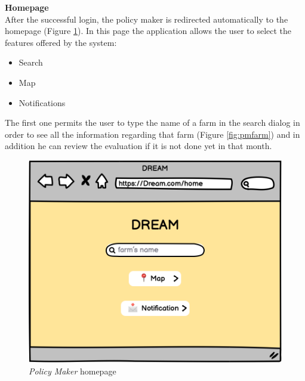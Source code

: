 \textbf{Homepage} \\
After the successful login, the policy maker is redirected automatically to the homepage (Figure \ref{fig:pmhome}). 
In this page the application allows the user to select the features offered by the system:
\begin{itemize}
    \item Search
    \item Map
    \item Notifications
\end{itemize}
The first one permits the user to type the name of a farm in the search dialog in order to see all the information regarding that farm (Figure \ref{fig:pmfarm}) and in addition he can review the evaluation if it is not done yet in that month.

\begin{figure}[H]
    \begin{minipage}{0.4\textwidth}
        \centering
        \includegraphics[width=1\textwidth]{images/mockups/PMHome.png}
        \caption{\emph{Policy Maker} homepage}
        \label{fig:pmhome}
    \end{minipage}\hfill
    \begin{minipage}{0.39\textwidth}
        \centering

\end{minipage}
\end{figure}
